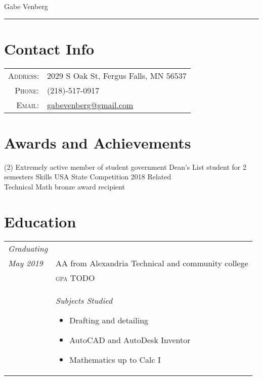 \documentclass[letterpaper,10pt]{article}
\begin{document}
\pagestyle{empty}%

	\par{\centering
		{\huge Gabe Venberg
	}\bigskip\par}
\hrule
\section*{Contact Info}
	\begin{tabular}{rl}
	\textsc{Address:} & 2029 S Oak St, Fergus Falls, MN 56537\\
	\textsc{Phone:} & (218)-517-0917\\
	\textsc{Email:} & \href{mailto:gabevenberg@gmail.com}{gabevenberg@gmail.com}\\
	\end{tabular}
\section*{Awards and Achievements}
	\begin{tasks}[style=itemize](2)
	\task Extremely active member of student government
	\task Dean's List student for 2 semesters
	\task Skills USA State Competition 2018 Related\\Technical Math bronze award recipient
	\end{tasks}
\section*{Education}
	\begin{tabular}{R{2cm}|p{14cm}}
	\textsl{Graduating}\\
	\textsl{May 2019} & AA from Alexandria Technical and community college\\
	&\textsc{gpa} TODO\\
	&\textsl{Subjects Studied} \begin{itemize}[noitemsep]
	\item Drafting and detailing
	\item AutoCAD and AutoDesk Inventor
	\item Mathematics up to Calc I
	\end{itemize}
	\end{tabular}
\end{document}
